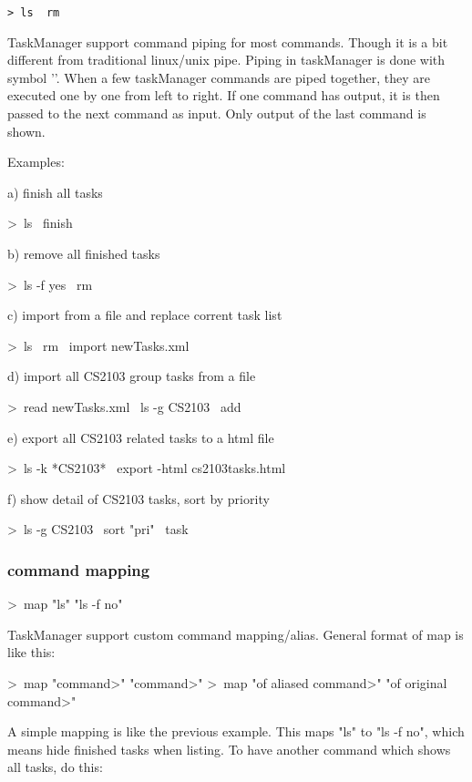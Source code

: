 \documentclass[12pt, a4paper]{article}
\begin{document}
\texttt{\textgreater \ ls \textbar \  rm}

TaskManager support command piping for most commands. Though it is a bit different from traditional linux/unix pipe.
Piping in taskManager is done with symbol '\textbar'. When a few taskManager commands are piped together, they are executed one by one from left to right. 
If one command has output, it is then passed to the next command as input. Only output of the last command is shown.

Examples:
    
a) finish all tasks 

    \textgreater \ ls \textbar \  finish

b) remove all finished tasks

    \textgreater \ ls -f yes \textbar \  rm

c) import from a file and replace corrent task list

    \textgreater \ ls \textbar \  rm \textbar \  import newTasks.xml

d) import all CS2103 group tasks from a file

    \textgreater \ read newTasks.xml \textbar \  ls -g CS2103 \textbar \  add

e) export all CS2103 related tasks to a html file
    
    \textgreater \ ls -k *CS2103* \textbar \  export -html cs2103tasks.html

f) show detail of CS2103 tasks, sort by priority

    \textgreater \ ls -g CS2103 \textbar \  sort "pri" \textbar \  task


\subsubsection{command mapping}

    \textgreater \ map "ls" "ls -f no"

TaskManager support custom command mapping/alias. General format of map is like this:

    \textgreater \ map "\textlessnew command\textgreater" "\textlessoriginal command\textgreater"
    \textgreater \ map "\textlesspattern of aliased command\textgreater" "\textlesspattern of original command\textgreater"

A simple mapping is like the previous example. This maps "ls" to "ls -f no", which means hide finished tasks when listing.
To have another command which shows all tasks, do this:
\end{document}
